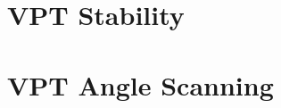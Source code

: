 
\section{VPT Stability}
\label{sec:vpt_stable}



\section{VPT Angle Scanning}
\label{sec:vpt_angle}




